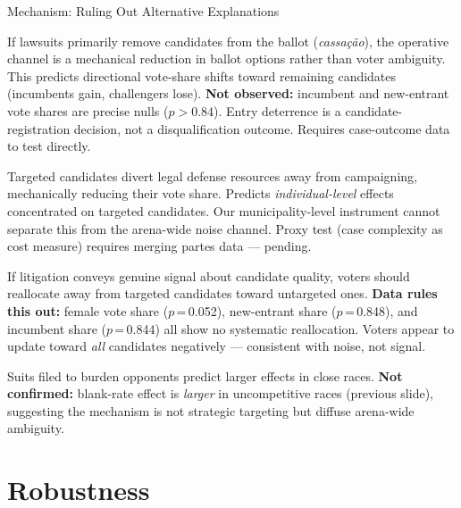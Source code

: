 \documentclass[aspectratio=169,10pt]{beamer}
\begin{document}
\begin{frame}{Mechanism: Ruling Out Alternative Explanations}
\begin{description}\itemsep8pt
  \item[\textbf{Direct disqualification}]
    If lawsuits primarily remove candidates from the ballot (\emph{cassação}), the operative channel is a mechanical reduction in ballot options rather than voter ambiguity. This predicts directional vote-share shifts toward remaining candidates (incumbents gain, challengers lose). \textbf{Not observed:} incumbent and new-entrant vote shares are precise nulls ($p > 0.84$). Entry deterrence is a candidate-registration decision, not a disqualification outcome. Requires case-outcome data to test directly.

  \item[\textbf{Campaign resource diversion}]
    Targeted candidates divert legal defense resources away from campaigning, mechanically reducing their vote share. Predicts \emph{individual-level} effects concentrated on targeted candidates. Our municipality-level instrument cannot separate this from the arena-wide noise channel. Proxy test (case complexity as cost measure) requires merging partes data --- pending.

  \item[\textbf{Directed information vs.\ diffuse noise}]
    If litigation conveys genuine signal about candidate quality, voters should reallocate away from targeted candidates toward untargeted ones. \textbf{Data rules this out:} female vote share ($p$\,=\,0.052), new-entrant share ($p$\,=\,0.848), and incumbent share ($p$\,=\,0.844) all show no systematic reallocation. Voters appear to update toward \emph{all} candidates negatively --- consistent with noise, not signal.

  \item[\textbf{Strategic lawfare}]
    Suits filed to burden opponents predict larger effects in close races. \textbf{Not confirmed:} blank-rate effect is \emph{larger} in uncompetitive races (previous slide), suggesting the mechanism is not strategic targeting but diffuse arena-wide ambiguity.
\end{description}
\end{frame}


\section{Robustness}
\end{document}
